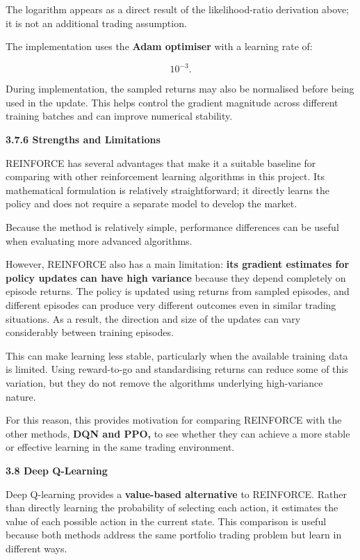 The logarithm appears as a direct result of the likelihood-ratio
derivation above; it is not an additional trading assumption.

The implementation uses the \textbf{Adam optimiser} with a learning rate
of:

\[10^{- 3}.\]

During implementation, the sampled returns may also be normalised before
being used in the update. This helps control the gradient magnitude
across different training batches and can improve numerical stability.

\textbf{3.7.6 Strengths and Limitations}

REINFORCE has several advantages that make it a suitable baseline for
comparing with other reinforcement learning algorithms in this project.
Its mathematical formulation is relatively straightforward; it directly
learns the policy and does not require a separate model to develop the
market.

Because the method is relatively simple, performance differences can be
useful when evaluating more advanced algorithms.

However, REINFORCE also has a main limitation: \textbf{its gradient
estimates for policy updates can have high variance} because they depend
completely on episode returns. The policy is updated using returns from
sampled episodes, and different episodes can produce very different
outcomes even in similar trading situations. As a result, the direction
and size of the updates can vary considerably between training episodes.

This can make learning less stable, particularly when the available
training data is limited. Using reward-to-go and standardising returns
can reduce some of this variation, but they do not remove the
algorithm\textquotesingle s underlying high-variance nature.

For this reason, this provides motivation for comparing REINFORCE with
the other methods, \textbf{DQN and PPO,} to see whether they can achieve
a more stable or effective learning in the same trading environment.

\textbf{3.8 Deep Q-Learning}

Deep Q-learning provides a \textbf{value-based alternative} to
REINFORCE. Rather than directly learning the probability of selecting
each action, it estimates the value of each possible action in the
current state. This comparison is useful because both methods address
the same portfolio trading problem but learn in different ways.

